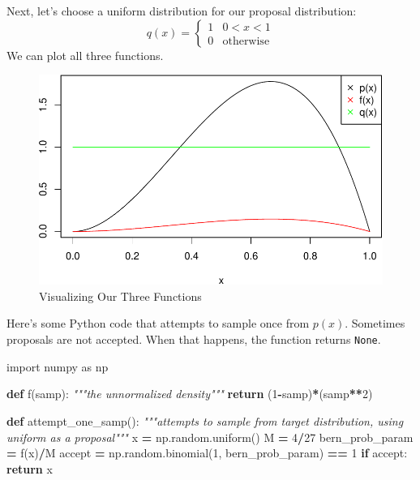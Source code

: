 \documentclass[
  12pt,
]{krantz}
\makeatletter
\newenvironment{Shaded}{\begin{snugshade}}{\end{snugshade}}
\newcommand{\CommentTok}[1]{\textcolor[rgb]{0.37,0.37,0.37}{\textit{#1}}}
\newcommand{\ControlFlowTok}[1]{\textcolor[rgb]{0.27,0.27,0.27}{\textbf{#1}}}
\newcommand{\DecValTok}[1]{\textcolor[rgb]{0.06,0.06,0.06}{#1}}
\newcommand{\ImportTok}[1]{#1}
\newcommand{\KeywordTok}[1]{\textcolor[rgb]{0.27,0.27,0.27}{\textbf{#1}}}
\newcommand{\NormalTok}[1]{#1}
\newcommand{\OperatorTok}[1]{\textcolor[rgb]{0.43,0.43,0.43}{\textbf{#1}}}
\newenvironment{kframe}{%
\medskip{}
\setlength{\fboxsep}{.8em}
 \def\at@end@of@kframe{}%
 \ifinner\ifhmode%
  \def\at@end@of@kframe{\end{minipage}}%
  \begin{minipage}{\columnwidth}%
 \fi\fi%
 \def\FrameCommand##1{\hskip\@totalleftmargin \hskip-\fboxsep
 \colorbox{shadecolor}{##1}\hskip-\fboxsep
     \hskip-\linewidth \hskip-\@totalleftmargin \hskip\columnwidth}%
 \MakeFramed {\advance\hsize-\width
   \@totalleftmargin\z@ \linewidth\hsize
   \@setminipage}}%
 {\par\unskip\endMakeFramed%
 \at@end@of@kframe}
\renewenvironment{Shaded}{\begin{kframe}}{\end{kframe}}
\makeatother
\begin{document}
Next, let's choose a uniform distribution for our proposal distribution:
\[
q(x) = 
\begin{cases}
1 & 0 < x < 1 \\
0 & \text{otherwise}
\end{cases}
\]
We can plot all three functions.

\begin{figure}
\includegraphics[width=0.8\linewidth]{r_and_python_book_files/figure-latex/unnamed-chunk-139-1} \caption{Visualizing Our Three Functions}\label{fig:unnamed-chunk-139}
\end{figure}

Here's some Python code that attempts to sample once from \(p(x)\). Sometimes proposals are not accepted. When that happens, the function returns \texttt{None}.

\begin{Shaded}
\begin{Highlighting}[]
\ImportTok{import}\NormalTok{ numpy }\ImportTok{as}\NormalTok{ np}

\KeywordTok{def}\NormalTok{ f(samp):}
    \CommentTok{"""the unnormalized density"""}
    \ControlFlowTok{return}\NormalTok{ (}\DecValTok{1}\OperatorTok{{-}}\NormalTok{samp)}\OperatorTok{*}\NormalTok{(samp}\OperatorTok{**}\DecValTok{2}\NormalTok{)}

\KeywordTok{def}\NormalTok{ attempt\_one\_samp():}
    \CommentTok{"""attempts to sample from target distribution, using uniform as a proposal"""}
\NormalTok{    x }\OperatorTok{=}\NormalTok{ np.random.uniform()}
\NormalTok{    M }\OperatorTok{=} \DecValTok{4}\OperatorTok{/}\DecValTok{27}
\NormalTok{    bern\_prob\_param }\OperatorTok{=}\NormalTok{ f(x)}\OperatorTok{/}\NormalTok{M}
\NormalTok{    accept }\OperatorTok{=}\NormalTok{ np.random.binomial(}\DecValTok{1}\NormalTok{, bern\_prob\_param) }\OperatorTok{==} \DecValTok{1}
    \ControlFlowTok{if}\NormalTok{ accept:}
        \ControlFlowTok{return}\NormalTok{ x}
\end{Highlighting}
\end{Shaded}
\end{document}
